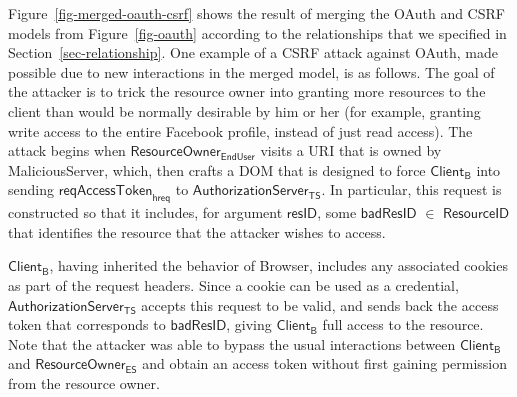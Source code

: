 Figure~\ref{fig-merged-oauth-csrf} shows the result of merging the
OAuth and CSRF models from Figure~\ref{fig-oauth} according to the
relationships that we specified in Section~\ref{sec-relationship}.
One example of a CSRF attack against OAuth, made possible due to new
interactions in the merged model, is as follows. The goal of the
attacker is to trick the resource owner into granting more resources
to the client than would be normally desirable by him or her (for
example, granting write access to the entire Facebook profile, instead
of just read access). The attack begins when
$\textsf{ResourceOwner}_\textsf{EndUser}$ visits a URI that is owned
by \textsf{MaliciousServer}, which, then crafts a DOM that is designed
to force $\textsf{Client}_\textsf{B}$ into sending
$\textsf{reqAccessToken}_\textsf{hreq}$ to
$\textsf{AuthorizationServer}_\textsf{TS}$. In particular, this
request is constructed so that it includes, for argument
$\textsf{resID}$, some $\textsf{badResID}$ $\in$ $\textsf{ResourceID}$
that identifies the resource that the attacker wishes to access.

$\textsf{Client}_\textsf{B}$, having inherited the behavior of
\textsf{Browser}, includes any associated cookies as part of the
request headers. Since a cookie can be used as a credential,
$\textsf{AuthorizationServer}_\textsf{TS}$ accepts this request to be
valid, and sends back the access token that corresponds to
$\textsf{badResID}$, giving $\textsf{Client}_\textsf{B}$ full access
to the resource. Note that the attacker was able to bypass the usual
interactions between $\textsf{Client}_\textsf{B}$ and
$\textsf{ResourceOwner}_\textsf{ES}$ and obtain an access token
without first gaining permission from the resource owner.
